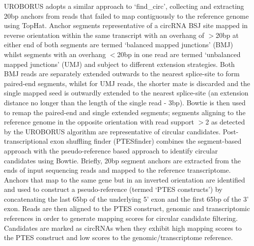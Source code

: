 \documentclass[journal,review,submit,pdftex,moreauthors]{Definitions/mdpi}
\begin{document}
UROBORUS \cite{UROBORUS} adopts a similar approach to `find\_circ', collecting and extracting 20bp anchors from reads that failed to map contiguously to the reference genome using TopHat. Anchor segments representative of a circRNA BSJ site mapped in reverse orientation within the same transcript with an overhang of $>$20bp at either end of both segments are termed `balanced mapped junctions' (BMJ) whilst segments with an overhang $<$20bp in one read are termed `unbalanced mapped junctions' (UMJ) and subject to different extension strategies. Both BMJ reads are separately extended outwards to the nearest splice-site to form paired-end segments, whilst for UMJ reads, the shorter mate is discarded and the single mapped seed is outwardly extended to the nearest splice-site (an extension distance no longer than the length of the single read - 3bp). Bowtie is then used to remap the paired-end and single extended segments; segments aligning to the reference genome in the opposite orientation with read support $>$2 as detected by the UROBORUS algorithm are representative of circular candidates. Post-transcriptional exon shuffling finder (PTESfinder) \cite{PTESfinder} combines the segment-based approach with the pseudo-reference based approach to identify circular candidates using Bowtie. Briefly, 20bp segment anchors are extracted from the ends of input sequencing reads and mapped to the reference transcriptome. Anchors that map to the same gene but in an inverted orientation are identified and used to construct a pseudo-reference (termed `PTES constructs') by concatenating the last 65bp of the underlying 5' exon and the first 65bp of the 3' exon. Reads are then aligned to the PTES construct, genomic and transcriptomic references in order to generate mapping scores for circular candidate filtering. Candidates are marked as circRNAs when they exhibit high mapping scores to the PTES construct and low scores to the genomic/transcriptome reference. \par 
\end{document}
